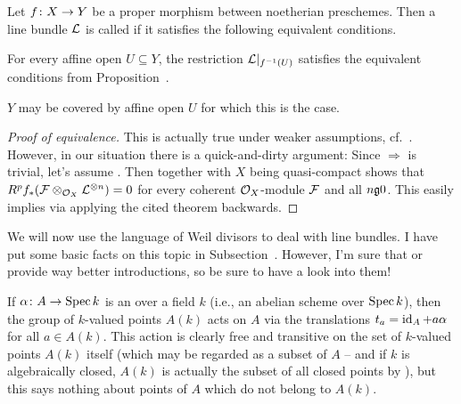 \documentclass[a4paper,parskip=half,numbers=enddot, DIV=12]{scrreprt}
\begin{document}
\begin{defi}
	Let $f\colon X\morphism Y$ be a proper morphism between noetherian preschemes. Then a line bundle $\mathcal{L}$ is called  if it satisfies the following equivalent conditions.
	\begin{alphanumerate}
		\item For every affine open $U\subseteq Y$, the restriction $\mathcal{L}|_{f^{-1}(U)}$ satisfies the equivalent conditions from Proposition~.
		\item $Y$ may be covered by affine open $U$ for which this is the case.
	\end{alphanumerate}
\end{defi}
\begin{proof}[Proof of equivalence]
	This is actually true under weaker assumptions, cf.\ \cite[]{stacks-project}. However, in our situation there is a quick-and-dirty argument: Since  $\Rightarrow$  is trivial, let's assume . Then \cite[Theorem~6 and ]{alggeo2} together with $X$ being quasi-compact shows that $R^pf_*(\mathcal{F}\otimes_{\mathcal{O}_X}\mathcal{L}^{\otimes n})=0$ for every coherent $\mathcal{O}_X$-module $\mathcal{F}$ and all $n\gge 0$. This easily implies  via applying the cited theorem backwards.
\end{proof}
We will now use the language of Weil divisors to deal with line bundles. I have put some basic facts on this topic in Subsection~. However, I'm sure that \cite[]{stacks-project} or \cite[Section~II.6]{hartshorne} provide way better introductions, so be sure to have a look into them!

If $\alpha\colon A\morphism\Spec k$ is an  over a field $k$ (i.e., an abelian scheme over $\operatorname{Spec} k$), then the group of $k$-valued points $A(k)$ acts on $A$ via the translations $t_a=\operatorname{id}_A+a\alpha$ for all $a\in A(k)$. This action is clearly free and transitive on the set of $k$-valued points $A(k)$ itself (which may be regarded as a subset of $A$ -- and if $k$ is algebraically closed, $A(k)$ is actually the subset of all closed points by ), but this says nothing about points of $A$ which do not belong to $A(k)$.
\end{document}
